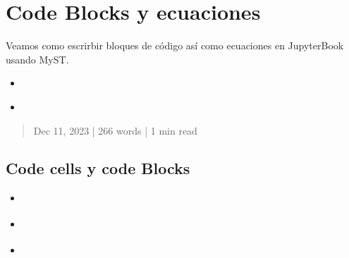 \documentclass[letterpaper,10pt,english]{jupyterBook}
\begin{document}
\chapter{Code Blocks y ecuaciones}
\label{\detokenize{docs/01_00_Code_Blocks_y_ecuaciones:code-blocks-y-ecuaciones}}\label{\detokenize{docs/01_00_Code_Blocks_y_ecuaciones:sec-code-blocks-y-ecuaciones}}\label{\detokenize{docs/01_00_Code_Blocks_y_ecuaciones::doc}}
\sphinxAtStartPar
Veamos como escrirbir bloques de código así como ecuaciones en JupyterBook usando MyST.
\begin{itemize}
\item {} 
\sphinxAtStartPar
{\hyperref[\detokenize{docs/01_01_Code_Blocks::doc}]{}}

\item {} 
\sphinxAtStartPar
{\hyperref[\detokenize{docs/01_02_Ecuaciones::doc}]{}}

\end{itemize}

\sphinxstepscope
\begin{quote}

\sphinxAtStartPar
Dec 11, 2023 | 266 words | 1 min read
\end{quote}


\section{Code cells y code Blocks}
\label{\detokenize{docs/01_01_Code_Blocks:code-cells-y-code-blocks}}\label{\detokenize{docs/01_01_Code_Blocks:sec-code-blocks}}\label{\detokenize{docs/01_01_Code_Blocks::doc}}
\begin{sphinxShadowBox}
\begin{itemize}
\item {} 
\sphinxAtStartPar
{}\label{\detokenize{docs/01_01_Code_Blocks:id1}}{\hyperref[\detokenize{docs/01_01_Code_Blocks:code-blocks-and-outputs}]{}}

\item {} 
\sphinxAtStartPar
{}\label{\detokenize{docs/01_01_Code_Blocks:id2}}{\hyperref[\detokenize{docs/01_01_Code_Blocks:glue-para-insertar-variables-en-el-texto}]{}}

\item {} 
\sphinxAtStartPar
{}\label{\detokenize{docs/01_01_Code_Blocks:id3}}{\hyperref[\detokenize{docs/01_01_Code_Blocks:estadisticas-de-las-ejecuciones}]{}}

\end{itemize}
\end{sphinxShadowBox}
\end{document}
